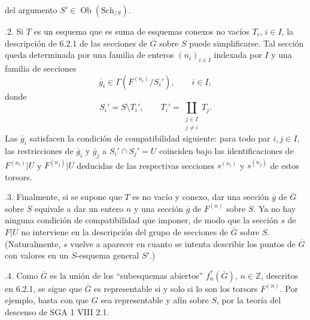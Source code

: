 del argumento $S'\in\operatorname{Ob}(\mathrm{Sch}_{/S})$.

\medskip
{}.2. Si $T$ es un esquema que es suma de esquemas conexos
no vacíos $T_i$, $i\in I$, la descripción de 6.2.1 de las secciones de
$\overline G$ sobre $S$ puede simplificarse. Tal sección queda
determinada por una familia de enteros $(n_i)_{i\in I}$ indexada por
$I$ y una familia de secciones
\[
 \overline g_i\in\Gamma(F^{(n_i)}/S_i'),\qquad i\in I,
\]
donde
\[
 S_i'=S\setminus T_i',
 \qquad
 T_i'=\coprod_{\substack{j\in I\\j\ne i}}T_j.
\]
Las $\overline g_i$ satisfacen la condición de compatibilidad
siguiente: para todo par $i,j\in I$, las restricciones de
$\overline g_i$ y $\overline g_j$ a $S_i'\cap S_j'=U$ coinciden bajo
las identificaciones de $F^{(n_i)}|U$ y $F^{(n_j)}|U$ deducidas de las
respectivas secciones $s^{(n_i)}$ y $s^{(n_j)}$ de estos torsors.

\medskip
{}.3. Finalmente, si se supone que $T$ es no vacío y
conexo, dar una sección $\overline g$ de $\overline G$ sobre $S$
equivale a dar un entero $n$ y una sección $\overline g$ de $F^{(n)}$
sobre $S$. Ya no hay ninguna condición de compatibilidad que imponer,
de modo que la sección $s$ de $F|U$ no interviene en la descripción del
grupo de secciones de $\overline G$ sobre $S$. (Naturalmente, $s$
vuelve a aparecer en cuanto se intenta describir los puntos de
$\overline G$ con valores en un $S$-esquema general $S'$.)

\medskip
{}.4. Como $\overline G$ es la unión de los
``subesquemas abiertos'' $f_n^*(\overline G)$, $n\in\mathbb Z$,
descritos en 6.2.1, se sigue que $\overline G$ es representable si y
solo si lo son los torsors $F^{(n)}$. Por ejemplo, basta con que $G$
sea representable y afín sobre $S$, por la teoría del descenso de
SGA 1 VIII 2.1.

